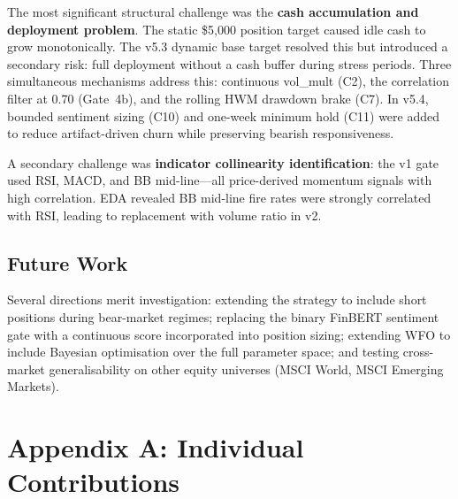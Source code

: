 \documentclass[11pt,twoside,a4paper]{article}
\begin{document}
The most significant structural challenge was the \textbf{cash accumulation and deployment problem}. The static \$5,000 position target caused idle cash to grow monotonically. The v5.3 dynamic base target resolved this but introduced a secondary risk: full deployment without a cash buffer during stress periods. Three simultaneous mechanisms address this: continuous vol\_mult (C2), the correlation filter at 0.70 (Gate~4b), and the rolling HWM drawdown brake (C7). In v5.4, bounded sentiment sizing (C10) and one-week minimum hold (C11) were added to reduce artifact-driven churn while preserving bearish responsiveness.

A secondary challenge was \textbf{indicator collinearity identification}: the v1 gate used RSI, MACD, and BB mid-line---all price-derived momentum signals with high correlation. EDA revealed BB mid-line fire rates were strongly correlated with RSI, leading to replacement with volume ratio in v2.

\subsection{Future Work}

Several directions merit investigation: extending the strategy to include short positions during bear-market regimes; replacing the binary FinBERT sentiment gate with a continuous score incorporated into position sizing; extending WFO to include Bayesian optimisation over the full parameter space; and testing cross-market generalisability on other equity universes (MSCI World, MSCI Emerging Markets).



\vfill
\newpage

\vfill
\newpage

\section*{Appendix A: Individual Contributions}
\end{document}
